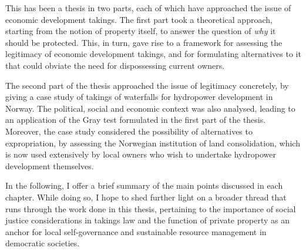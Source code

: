 This has been a thesis in two parts, each of which have approached the issue of economic development takings. The first part took a theoretical approach, starting from the notion of property itself, to answer the question of {\it why} it should be protected. This, in turn, gave rise to a framework for assessing the legitimacy of economic development takings, and for formulating alternatives to it that could obviate the need for dispossessing current owners.

The second part of the thesis approached the issue of legitimacy concretely, by giving a case study of takings of waterfalls for hydropower development in Norway. The political, social and economic context was also analysed, leading to an application of the Gray test formulated in the first part of the thesis. Moreover, the case study considered the possibility of alternatives to expropriation, by assessing the Norwegian institution of land consolidation, which is now used extensively by local owners who wish to undertake hydropower development themselves.




In the following, I offer a brief summary of the main points discussed in each chapter. While doing so, I hope to shed further light on a broader thread that runs through the work done in this thesis, pertaining to the importance of social justice considerations in takings law and the function of private property as an anchor for local self-governance and sustainable resource management in democratic societies.


